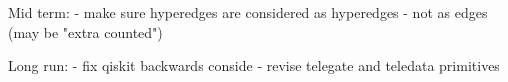 
Mid term:
- make sure hyperedges are considered as hyperedges - not as edges (may be "extra counted")

Long run:
- fix qiskit backwards conside 
- revise telegate and teledata primitives